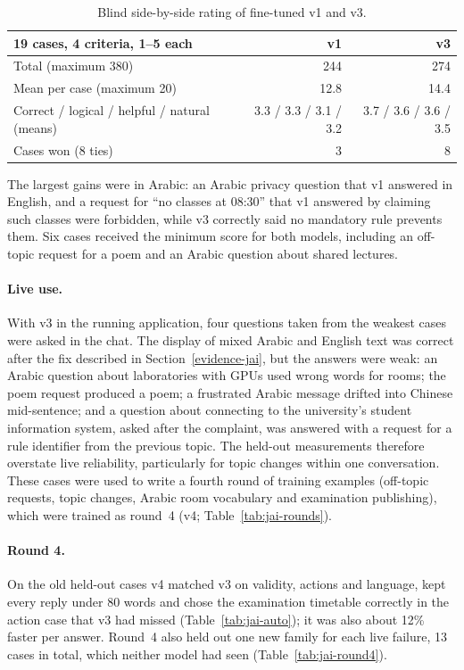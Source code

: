 \begin{table}[h]
\centering
\small
\begin{tabular}{@{}lrr@{}}
\toprule
19 cases, 4 criteria, 1--5 each & v1 & v3 \\
\midrule
Total (maximum 380) & 244 & 274 \\
Mean per case (maximum 20) & 12.8 & 14.4 \\
Correct / logical / helpful / natural (means) & 3.3 / 3.3 / 3.1 / 3.2 & 3.7 / 3.6 / 3.6 / 3.5 \\
Cases won (8 ties) & 3 & 8 \\
\bottomrule
\end{tabular}
\caption{Blind side-by-side rating of fine-tuned v1 and v3.}
\label{tab:jai-rating}
\end{table}

The largest gains were in Arabic: an Arabic privacy question that v1 answered in English, and a request for ``no classes at 08:30'' that v1 answered by claiming such classes were forbidden, while v3 correctly said no mandatory rule prevents them. Six cases received the minimum score for both models, including an off-topic request for a poem and an Arabic question about shared lectures.

\paragraph{Live use.} With v3 in the running application, four questions taken from the weakest cases were asked in the chat. The display of mixed Arabic and English text was correct after the fix described in Section~\ref{evidence-jai}, but the answers were weak: an Arabic question about laboratories with GPUs used wrong words for rooms; the poem request produced a poem; a frustrated Arabic message drifted into Chinese mid-sentence; and a question about connecting to the university's student information system, asked after the complaint, was answered with a request for a rule identifier from the previous topic. The held-out measurements therefore overstate live reliability, particularly for topic changes within one conversation. These cases were used to write a fourth round of training examples (off-topic requests, topic changes, Arabic room vocabulary and examination publishing), which were trained as round~4 (v4; Table~\ref{tab:jai-rounds}).

\paragraph{Round 4.} On the old held-out cases v4 matched v3 on validity, actions and language, kept every reply under 80 words and chose the examination timetable correctly in the action case that v3 had missed (Table~\ref{tab:jai-auto}); it was also about 12\% faster per answer. Round~4 also held out one new family for each live failure, 13 cases in total, which neither model had seen (Table~\ref{tab:jai-round4}).

